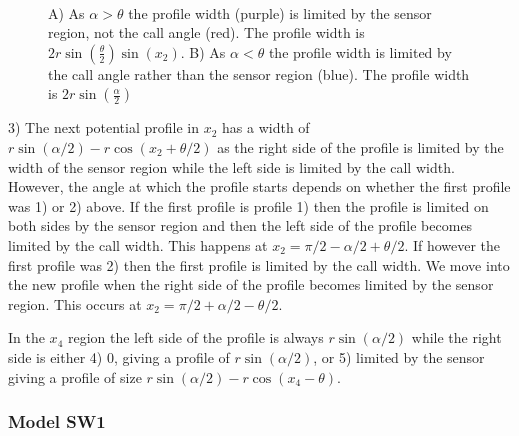\begin{figure}[t]
        \centering
        \begin{subfigure}[t]{0.4\textwidth}
                \centering
                \caption{}
                \label{f:p33x2a}
        \end{subfigure}
	~
	\begin{subfigure}[t]{0.4\textwidth}
                \centering
                \caption{}
                \label{f:p33x2t}
        \end{subfigure}

\caption{A) As $\alpha > \theta$ the profile width (purple) is limited by the sensor region, not the call angle (red). The profile width is $2r\sin\left(\frac{\theta}{2}\right)\sin(x_2)$. B) As $\alpha < \theta$ the profile width is limited by the call angle rather than the sensor region (blue). The profile width is $2r\sin\left(\frac{\alpha}{2}\right)$   }
\label{f:p33}
\end{figure}

3) The next potential profile in $x_2$ has a width of $r\sin(\alpha/2) - r\cos(x_2 + \theta/2)$ as the right side of the profile is limited by the width of the sensor region while the left side is limited by the call width. However, the angle at which the profile starts depends on whether the first profile was 1) or 2) above. If the first profile is profile 1) then the profile is limited on both sides by the sensor region and then the left side of the profile becomes limited by the call width. This happens at $x_2 = \pi/2 - \alpha/2 + \theta/2$. If however the first profile was 2) then the first profile is limited by the call width. We move into the new profile when the right side of the profile becomes limited by the sensor region. This occurs at $x_2 = \pi/2 + \alpha/2 - \theta/2$.


In the $x_4$ region the left side of the profile is always $r\sin(\alpha /2)$ while the right side is either 4) 0, giving a profile of $r\sin(\alpha /2)$, or 5) limited by the sensor giving a profile of size $r\sin (\alpha /2) -r\cos(x_4-\theta) $.

\subsubsection{Model SW1} \label{SW1}

